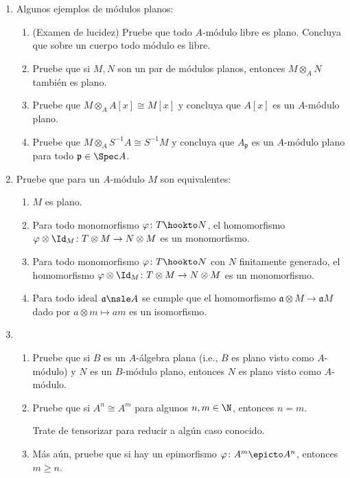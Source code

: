 \documentclass[11pt, reqno]{amsart}
\begin{document}
\begin{enumerate}
	\item Algunos ejemplos de módulos planos:
		\begin{enumerate}
			\item (Examen de lucidez) Pruebe que todo $A$-módulo libre es plano.
				Concluya que sobre un cuerpo todo módulo es libre.
			\item Pruebe que si $M, N$ son un par de módulos planos, entonces $M\otimes_A N$ también
				es plano.
			\item Pruebe que $M \otimes_A A[x] \cong M[x]$ y concluya que $A[x]$ es un $A$-módulo plano.
			\item Pruebe que $M \otimes_A S^{-1}A \cong S^{-1}M$ y concluya que $A_{\mathfrak{p}}$ es un
				$A$-módulo plano para todo $\mathfrak{p} \in \Spec A$.
		\end{enumerate}

	\item Pruebe que para un $A$-módulo $M$ son equivalentes:
		\begin{enumerate}
			\item $M$ es plano.
			\item Para todo monomorfismo $\varphi \colon T \hookto N$, el homomorfismo $\varphi\otimes\Id_M
				\colon T\otimes M \to N\otimes M$ es un monomorfismo.
			\item Para todo monomorfismo $\varphi \colon T \hookto N$ con $N$ finitamente generado, el
				homomorfismo $\varphi\otimes\Id_M \colon T\otimes M \to N\otimes M$ es un monomorfismo.
			\item Para todo ideal $\mathfrak{a} \nsle A$ se cumple que el homomorfismo $\mathfrak{a}\otimes
				M \to \mathfrak{a}M$ dado por $a\otimes m \mapsto am$ es un isomorfismo.
		\end{enumerate}

	\item
		\begin{enumerate}
			\item Pruebe que si $B$ es un $A$-álgebra plana (i.e., $B$ es plano visto como
				$A$-módulo) y $N$ es un $B$-módulo plano, entonces $N$ es plano visto como
				$A$-módulo.
			\item\lookright
				Pruebe que si $A^n \cong A^m$ para algunos $n, m \in \N$, entonces $n = m$.

				\begin{hint}
					Trate de tensorizar para reducir a algún caso conocido.
				\end{hint}
			\item Más aún, pruebe que si hay un epimorfismo $\varphi \colon A^m \epicto A^n$, entonces $m
				\ge n$.
		\end{enumerate}


\end{enumerate}
\end{document}
